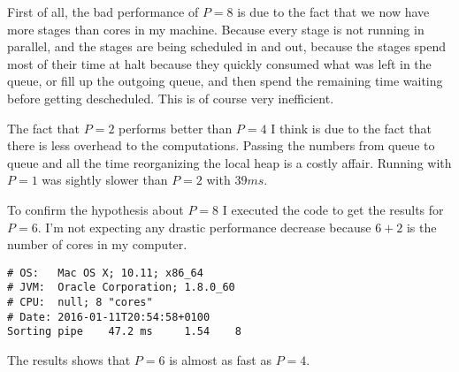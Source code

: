 \documentclass{ituhandin}
\begin{document}
First of all, the bad performance of $P = 8$ is due to the fact that we now have more stages than cores in my machine. Because every stage is not running in parallel, and the stages are being scheduled in and out, because the stages spend most of their time at halt because they quickly consumed what was left in the queue, or fill up the outgoing queue, and then spend the remaining time waiting before getting descheduled. This is of course very inefficient. 

The fact that $P = 2$ performs better than $P = 4$ I think is due to the fact that there is less overhead to the computations. Passing the numbers from queue to queue and all the time reorganizing the local heap is a costly affair. Running with $P = 1$ was sightly slower than $P = 2$ with $39ms$.

To confirm the hypothesis about $P = 8$ I executed the code to get the results for $P = 6$. I'm not expecting any drastic performance decrease because $6+2$ is the number of cores in my computer. 

\begin{lstlisting}[language={},frame={}]
# OS:   Mac OS X; 10.11; x86_64
# JVM:  Oracle Corporation; 1.8.0_60
# CPU:  null; 8 "cores"
# Date: 2016-01-11T20:54:58+0100
Sorting pipe    47.2 ms     1.54    8
\end{lstlisting}

The results shows that $P = 6$ is almost as fast as $P = 4$.

\chapter{} %
\end{document}
